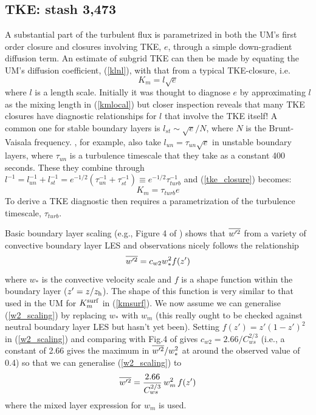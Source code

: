 \documentclass{UMDP_article}
\begin{document}
\subsection{TKE: stash 3,473}

A substantial part of the turbulent flux is parametrized in both the
UM's first order closure and closures involving TKE, $e$, through a
simple down-gradient diffusion term.  An estimate of subgrid TKE can
then be made by equating the UM's diffusion coefficient,
(\ref{klnl}), with that from a typical TKE-closure, \mbox{i.e.}
\begin{equation}
  K_m = l \sqrt{e}
  \label{tke_closure}
\end{equation}
where $l$ is a length scale.  Initially it was thought to diagnose $e$
by approximating $l$ as the mixing length in (\ref{kmlocal}) but
closer inspection reveals that many TKE closures have diagnostic
relationships for $l$ that involve the TKE itself!  A common one for
stable boundary layers is $l_{st} \sim \sqrt{e} / N$, where $N$ is the
Brunt-Vaisala frequency.  \cite{Suselj2012}, for example, also take
$l_{un} = \tau_{un} \sqrt{e} $ in unstable boundary layers, where
$\tau_{un}$ is a turbulence timescale that they take as a constant 400
seconds.  These they combine through $l^{-1}= l_{un}^{-1} +
l_{st}^{-1} = e^{-1/2}( \tau_{un}^{-1} + \tau_{st}^{-1}) \equiv
e^{-1/2}\tau_{turb}^{-1}$ and (\ref{tke_closure}) becomes:
\begin{equation*}
  K_m = \tau_{turb} e
\end{equation*}
To derive a TKE diagnostic then requires a parametrization of the
turbulence timescale, $\tau_{turb}$.

Basic boundary layer scaling (\mbox{e.g.}, Figure 4 of
\cite{holtslag91:_eddy_diffus_count_trans_convec}) shows that
$\overline{w'^2}$ from a variety of convective boundary layer LES and
observations nicely follows the relationship
\begin{equation}
  \overline{w'^2} = c_{w2} w_*^2 f(z')
  \label{w2_scaling}
\end{equation}
where $w_*$ is the convective velocity scale and $f$ is a shape
function within the boundary layer ($z'=z/z_{\rm h}$).  The shape of this
function is very similar to that used in the UM for $K_m^{\rm surf}$ in
(\ref{kmsurf}).  We now assume we can generalise (\ref{w2_scaling}) by
replacing $w_*$ with $w_m$ (this really ought to be checked against
neutral boundary layer LES but hasn't yet been).  Setting $ f(z')=z'
(1-z')^2$ in (\ref{w2_scaling}) and comparing with Fig.4 of
\cite{holtslag91:_eddy_diffus_count_trans_convec} gives $c_{w2}= 2.66
/ C_{ws}^{2/3}$ (\mbox{i.e.}, a constant of 2.66 gives the maximum in
$\overline{w'^2}/w_*^2$ at around the observed value of 0.4) so that we can
generalise (\ref{w2_scaling}) to
\begin{equation}
  \overline{w'^2} = \frac{2.66 }{C_{ws}^{2/3}} \, w_m^2\, f(z')
  \label{gen_w2_scaling}
\end{equation}
where the mixed layer expression for $w_m$ is used.  
\end{document}
